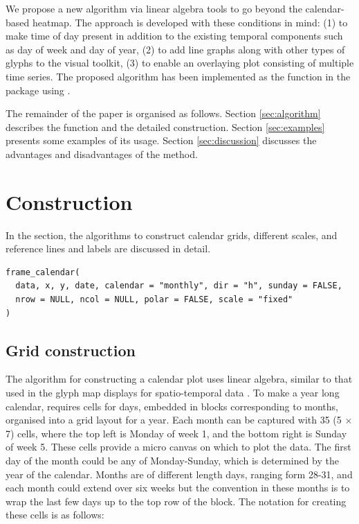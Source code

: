 \documentclass[article]{jss}
\begin{document}
We propose a new algorithm via linear algebra tools to go beyond the
calendar-based heatmap. The approach is developed with these conditions
in mind: (1) to make time of day present in addition to the existing
temporal components such as day of week and day of year, (2) to add line
graphs along with other types of glyphs to the visual toolkit, (3) to
enable an overlaying plot consisting of multiple time series. The
proposed algorithm has been implemented as the 
function in the  package \citep{R-sugrrants} using
 \citep{R-base}.

The remainder of the paper is organised as follows. Section
\ref{sec:algorithm} describes the  function and the
detailed construction. Section \ref{sec:examples} presents some examples
of its usage. Section \ref{sec:discussion} discusses the advantages and
disadvantages of the method.

\section{Construction}\label{construction}

\label{sec:algorithm}

In the section, the algorithms to construct calendar grids, different
scales, and reference lines and labels are discussed in detail.

\begin{verbatim}
frame_calendar(
  data, x, y, date, calendar = "monthly", dir = "h", sunday = FALSE, 
  nrow = NULL, ncol = NULL, polar = FALSE, scale = "fixed"
)
\end{verbatim}

\subsection{Grid construction}\label{grid-construction}

\label{sec:grid}

The algorithm for constructing a calendar plot uses linear algebra,
similar to that used in the glyph map displays for spatio-temporal data
\citep{Wickham2012glyph}. To make a year long calendar, requires cells
for days, embedded in blocks corresponding to months, organised into a
grid layout for a year. Each month can be captured with 35 (5 \(\times\)
7) cells, where the top left is Monday of week 1, and the bottom right
is Sunday of week 5. These cells provide a micro canvas on which to plot
the data. The first day of the month could be any of Monday-Sunday,
which is determined by the year of the calendar. Months are of different
length days, ranging form 28-31, and each month could extend over six
weeks but the convention in these months is to wrap the last few days up
to the top row of the block. The notation for creating these cells is as
follows:
\end{document}
